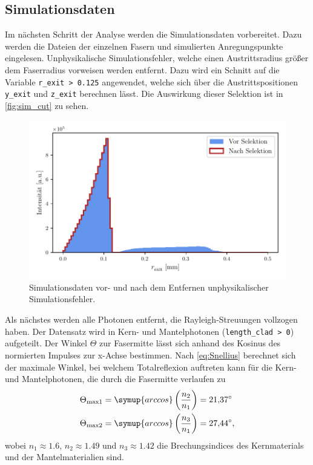 \subsection{Simulationsdaten}
Im nächsten Schritt der Analyse werden die Simulationsdaten vorbereitet. Dazu werden die Dateien der einzelnen Fasern und simulierten Anregungspunkte eingelesen.
Unphysikalische Simulationsfehler, welche einen Austrittsradius größer dem Faserradius vorweisen werden entfernt. Dazu wird ein Schnitt auf die Variable \texttt{r\_exit > 0.125}
angewendet, welche sich über die Austrittspositionen \texttt{y\_exit} und \texttt{z\_exit} berechnen lässt. Die Auswirkung dieser Selektion ist in \autoref{fig:sim_cut} zu sehen.
\begin{figure}
  \centering
  \includegraphics[width = .8\textwidth]{content/pics/r_exit_cut.pdf}
  \caption{Simulationsdaten vor- und nach dem Entfernen unphysikalischer Simulationsfehler.}
  \label{fig:sim_cut}
\end{figure}
Als nächstes werden alle Photonen entfernt, die Rayleigh-Streuungen vollzogen haben. Der Datensatz wird in Kern- und Mantelphotonen (\texttt{length\_clad > 0}) aufgeteilt.
Der Winkel $\Theta$ zur Fasermitte lässt sich anhand des Kosinus des normierten Impulses zur x-Achse bestimmen.
Nach \autoref{eq:Snellius} berechnet sich der maximale Winkel, bei welchem Totalreflexion auftreten kann für die Kern- und Mantelphotonen, die durch die Fasermitte verlaufen zu 
\begin{align*}
  \Theta_\text{max1} &= \symup{arccos}\left(\frac{n_2}{n_1}\right) = \qty{21.37}{\degree} \\
  \Theta_\text{max2} &= \symup{arccos}\left(\frac{n_3}{n_1}\right) = \qty{27.44}{\degree},
\end{align*}
wobei $n_1 \approx \num{1.6}$, $n_2 \approx \num{1.49}$ und $n_3 \approx \num{1.42}$ die Brechungsindices des Kernmaterials und der Mantelmaterialien sind.
